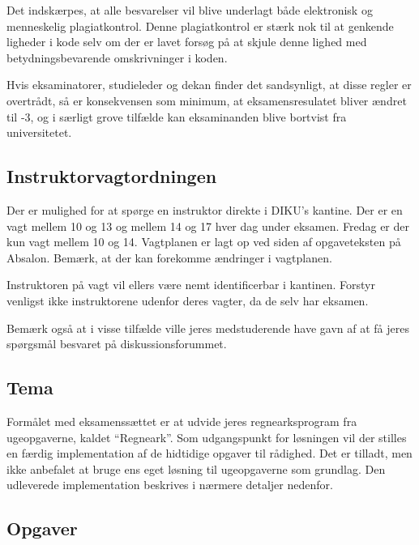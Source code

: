 Det indskærpes, at alle besvarelser vil blive underlagt både elektronisk og
menneskelig plagiatkontrol. Denne plagiatkontrol er stærk nok til at genkende
ligheder i kode selv om der er lavet forsøg på at skjule denne lighed med
betydningsbevarende omskrivninger i koden.

Hvis eksaminatorer, studieleder og dekan finder det sandsynligt, at disse
regler er overtrådt, så er konsekvensen som minimum, at eksamensresulatet
bliver ændret til -3, og i særligt grove tilfælde kan eksaminanden blive
bortvist fra universitetet.

\subsection{Instruktorvagtordningen}

Der er mulighed for at spørge en instruktor direkte i DIKU's kantine. Der er en
vagt mellem 10 og 13 og mellem 14 og 17 hver dag under eksamen. Fredag er der
kun vagt mellem 10 og 14. Vagtplanen er lagt op ved siden af opgaveteksten på
Absalon.  Bemærk, at der kan forekomme ændringer i vagtplanen.

Instruktoren på vagt vil ellers være nemt identificerbar i kantinen. Forstyr
venligst ikke instruktorene udenfor deres vagter, da de selv har eksamen.

Bemærk også at i visse tilfælde ville jeres medstuderende have gavn af
at få jeres spørgsmål besvaret på diskussionsforummet.

\subsection{Tema}


Formålet med eksamenssættet er at udvide jeres regnearksprogram fra
ugeopgaverne, kaldet ``Regneark''. Som udgangspunkt for løsningen vil der
stilles en færdig implementation af de hidtidige opgaver til rådighed. Det er
tilladt, men ikke anbefalet at bruge ens eget løsning til ugeopgaverne som
grundlag. Den udleverede implementation beskrives i nærmere detaljer nedenfor.

\subsection{Opgaver}

